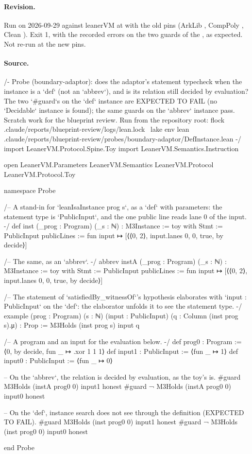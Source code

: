 \paragraph{Revision.} Run on 2026-09-29 against leanerVM  at  with the old pins (ArkLib , CompPoly , Clean ). Exit 1, with the recorded errors on the two guards of the , as expected. Not re-run at the new pins.

\paragraph{Source.}
\begin{leancode}[numbers=left,numbersep=3pt]
/-
  Probe (boundary-adaptor): does the adaptor's statement typecheck when the instance is a `def`
  (not an `abbrev`), and is its relation still decided by evaluation?
  The two `#guard`s on the `def` instance are EXPECTED TO FAIL (no `Decidable` instance is
  found); the same guards on the `abbrev` instance pass.
  Scratch work for the blueprint review.
  Run from the repository root:
    flock .claude/reports/blueprint-review/logs/lean.lock \
      lake env lean .claude/reports/blueprint-review/probes/boundary-adaptor/DefInstance.lean
-/
import LeanerVM.Protocol.Spine.Toy
import LeanerVM.Semantics.Instruction

open LeanerVM.Parameters LeanerVM.Semantics LeanerVM.Protocol LeanerVM.Protocol.Toy

namespace Probe

/-- A stand-in for `leanIsaInstance prog s`, as a `def` with parameters: the statement type is
`PublicInput`, and the one public line reads lane 0 of the input. -/
def inst (_prog : Program) (_s : ℕ) : M3Instance :=
  { toy with
    Stmt := PublicInput
    publicLines := fun input ↦ [⟨⟨0, 2⟩, input.lanes 0, 0, true, by decide⟩] }

/-- The same, as an `abbrev`. -/
abbrev instA (_prog : Program) (_s : ℕ) : M3Instance :=
  { toy with
    Stmt := PublicInput
    publicLines := fun input ↦ [⟨⟨0, 2⟩, input.lanes 0, 0, true, by decide⟩] }

/-- The statement of `satisfiedBy_witnessOf`'s hypothesis elaborates with `input : PublicInput`
on the `def`: the elaborator unfolds it to see the statement type. -/
example (prog : Program) (s : ℕ) (input : PublicInput) (q : Column (inst prog s).μ) : Prop :=
  M3Holds (inst prog s) input q

/-- A program and an input for the evaluation below. -/
def prog0 : Program := ⟨0, by decide, fun _ ↦ .xor 1 1 1⟩
def input1 : PublicInput := ⟨fun _ ↦ 1⟩
def input0 : PublicInput := ⟨fun _ ↦ 0⟩

-- On the `abbrev`, the relation is decided by evaluation, as the toy's is.
#guard M3Holds (instA prog0 0) input1 honest
#guard ¬ M3Holds (instA prog0 0) input0 honest

-- On the `def`, instance search does not see through the definition (EXPECTED TO FAIL).
#guard M3Holds (inst prog0 0) input1 honest
#guard ¬ M3Holds (inst prog0 0) input0 honest

end Probe
\end{leancode}

